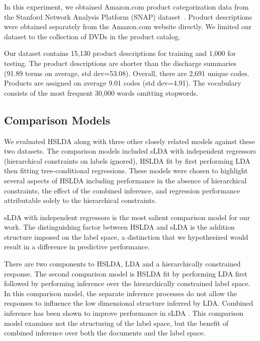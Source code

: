 In this experiment, we obtained Amazon.com product categorization data from 
the Stanford Network Analysis Platform (SNAP) dataset~\citep{SNAP}. 
Product descriptions were obtained separately from the
Amazon.com website directly. We limited our dataset to the collection of DVDs
in the product catalog.


Our dataset contains 15,130 product descriptions for training and 1,000
for testing. The product descriptions are shorter than the discharge summaries
(91.89 terms on average, std dev=53.08). Overall, there are 2,691 unique codes.
Products are assigned on average 9.01 codes (std dev=4.91). The vocabulary
consists of the most frequent 30,000 words omitting stopwords. 

\subsection{Comparison Models}

We evaluated HSLDA along with three other closely related models against 
these two datasets. The comparison models included sLDA with independent 
regressors (hierarchical constraints on labels ignored), HSLDA fit by first
performing LDA then fitting tree-conditional regressions. These models were chosen to 
highlight several aspects of HSLDA including performance in the absence 
of hierarchical constraints, the effect of the combined inference, and regression
performance attributable solely to the hierarchical constraints.

sLDA with independent regressors is the most salient comparison model
for our work. The distinguishing factor between HSLDA and sLDA is the
addition structure imposed on the label space, a distinction that we
hypothesized would result in a difference in predictive performance. 

There are two components to HSLDA, LDA and a hierarchically constrained response.
The second comparison model is HSLDA fit by performing LDA first followed by
performing inference over the hierarchically constrained label space. In this
comparison model, the separate inference processes do not allow the responses
to influence the low dimensional structure inferred by LDA. Combined inference
has been shown to improve performance in sLDA \citep{BleiMcAuliffe2008}. This
comparison model examines not the structuring of the label space, but the benefit
of combined inference over both the documents and the label space.

